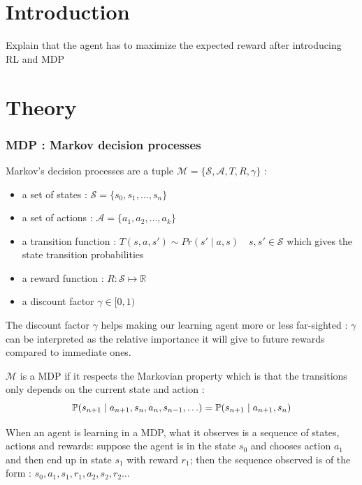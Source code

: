 \documentclass[14pt,a4paper]{article}
\theoremstyle{definition}
\begin{document}
\part*{Introduction}
Explain that the agent has to maximize the expected reward after introducing  RL and MDP
\citep{Xia2015}


\part*{Theory}

\section{MDP : Markov decision processes}



Markov's decision processes are a tuple  $\mathcal{M}=\{\mathcal{S},\mathcal{A},T,R,\gamma\}$ : 

\begin{itemize}
\item a set of states : $\mathcal{S}=\{s_0,s_1,\ldots,s_n\}$
\item a set of actions  : $\mathcal{A}=\{a_1,a_2,\ldots ,a_k\}$
\item a transition function :  $T(s,a,s') \sim  Pr(s'\mid a, s) \quad s,s' \in \mathcal{S}$ which gives the state transition probabilities
\item a reward function : $R:\mathcal{S}\mapsto \mathbb{R} $
\item a discount factor $\gamma \in [0,1)$
\end{itemize}


The discount factor $\gamma $ helps making our learning agent more or less far-sighted : $\gamma$ can be interpreted as the relative importance it will give to future rewards compared to immediate ones.

$\mathcal{M}$ is a MDP if it respects the Markovian property which is that the transitions only depends on the current state and action : 
\begin{equation*}
\mathbb{P}(s_{n+1}\mid a_{n+1},s_{n},a_{n},s_{n-1},\ldots)=\mathbb{P}(s_{n+1}\mid a_{n+1},s_{n})\\
\end{equation*}


When an agent is learning in a MDP, what it observes is a sequence of states, actions and rewards: suppose the agent is in the state $s_0$ and chooses action $a_1$ and then end up in state $s_1$ with reward $r_1$; then the sequence observed is of the form : $s_0,a_1,s_1,r_1,a_2,s_2,r_2\ldots$
\end{document}
